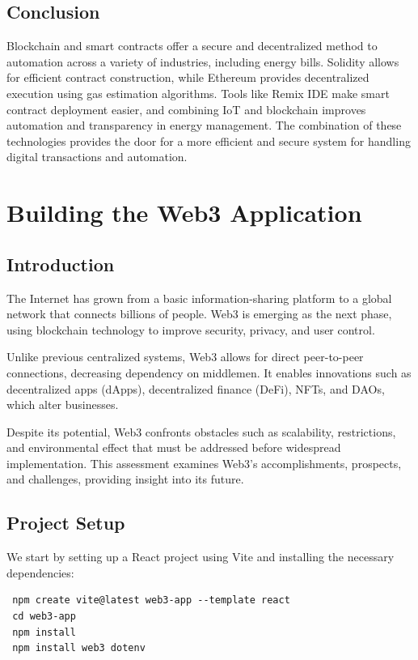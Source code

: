 \documentclass[a4paper,12pt]{report}
\begin{document}
 \section{Conclusion}
 Blockchain and smart contracts offer a secure and decentralized method to automation across a variety of industries, including energy bills.  Solidity allows for efficient contract construction, while Ethereum provides decentralized execution using gas estimation algorithms.  Tools like Remix IDE make smart contract deployment easier, and combining IoT and blockchain improves automation and transparency in energy management.  The combination of these technologies provides the door for a more efficient and secure system for handling digital transactions and automation.


\chapter{Building the Web3 Application}
\section{Introduction}
The Internet has grown from a basic information-sharing platform to a global network that connects billions of people\cite{aria2023influential}\cite{nabben2023web3}\cite{murray2023promise}.  Web3 is emerging as the next phase, using blockchain technology to improve security, privacy, and user control\cite{tennakoon2023smart}\cite{sadowski2023expansive}.

 Unlike previous centralized systems, Web3 allows for direct peer-to-peer connections, decreasing dependency on middlemen.  It enables innovations such as decentralized apps (dApps), decentralized finance (DeFi), NFTs, and DAOs, which alter businesses\cite{cong2023inclusion}.

 Despite its potential, Web3 confronts obstacles such as scalability, restrictions, and environmental effect that must be addressed before widespread implementation\cite{lacity2023quiet}\cite{wang2023novel}.  This assessment examines Web3's accomplishments, prospects, and challenges, providing insight into its future.

 \section{Project Setup}
 We start by setting up a React project using Vite and installing the necessary dependencies:
 
 \begin{lstlisting}
 npm create vite@latest web3-app --template react
 cd web3-app
 npm install
 npm install web3 dotenv
 \end{lstlisting}
 
\end{document}

